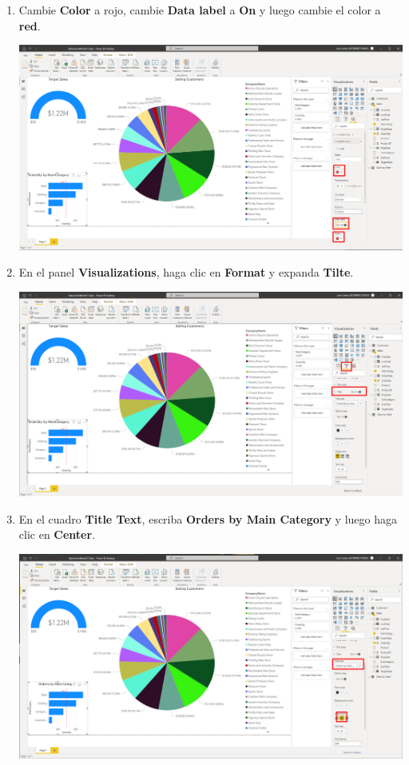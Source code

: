 \documentclass[12pt,letterpaper]{article}
\newcommand\tab[1][1cm]{\hspace*{#1}}
\begin{document}
\begin{enumerate}[\tab 1.]
\begin{center}
        \end{center}
        \item Cambie \textbf{Color} a rojo, cambie \textbf{Data label} a \textbf{On} y luego cambie el color a \textbf{red}.
        \begin{center}
            \includegraphics[width=13cm]{./img/img96.png}
        \end{center}
        \item En el panel \textbf{Visualizations}, haga clic en \textbf{Format} y expanda \textbf{Tilte}.
        \begin{center}
            \includegraphics[width=13cm]{./img/img97.png}
        \end{center}
        \item En el cuadro \textbf{Title Text}, escriba \textbf{Orders by Main Category} y luego haga clic en \textbf{Center}.
        \begin{center}
            \includegraphics[width=13cm]{./img/img98.png}

\end{center}
\end{enumerate}
\end{document}
